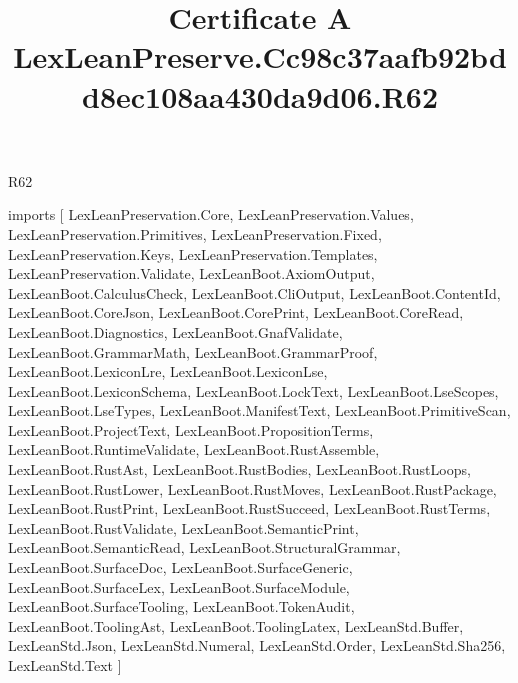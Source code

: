 \begin{lexlean}{R62}
\title{Certificate A LexLeanPreserve.Cc98c37aafb92bdd8ec108aa430da9d06.R62}
\begin{coremodule}
imports [
  LexLeanPreservation.Core,
  LexLeanPreservation.Values,
  LexLeanPreservation.Primitives,
  LexLeanPreservation.Fixed,
  LexLeanPreservation.Keys,
  LexLeanPreservation.Templates,
  LexLeanPreservation.Validate,
  LexLeanBoot.AxiomOutput,
  LexLeanBoot.CalculusCheck,
  LexLeanBoot.CliOutput,
  LexLeanBoot.ContentId,
  LexLeanBoot.CoreJson,
  LexLeanBoot.CorePrint,
  LexLeanBoot.CoreRead,
  LexLeanBoot.Diagnostics,
  LexLeanBoot.GnafValidate,
  LexLeanBoot.GrammarMath,
  LexLeanBoot.GrammarProof,
  LexLeanBoot.LexiconLre,
  LexLeanBoot.LexiconLse,
  LexLeanBoot.LexiconSchema,
  LexLeanBoot.LockText,
  LexLeanBoot.LseScopes,
  LexLeanBoot.LseTypes,
  LexLeanBoot.ManifestText,
  LexLeanBoot.PrimitiveScan,
  LexLeanBoot.ProjectText,
  LexLeanBoot.PropositionTerms,
  LexLeanBoot.RuntimeValidate,
  LexLeanBoot.RustAssemble,
  LexLeanBoot.RustAst,
  LexLeanBoot.RustBodies,
  LexLeanBoot.RustLoops,
  LexLeanBoot.RustLower,
  LexLeanBoot.RustMoves,
  LexLeanBoot.RustPackage,
  LexLeanBoot.RustPrint,
  LexLeanBoot.RustSucceed,
  LexLeanBoot.RustTerms,
  LexLeanBoot.RustValidate,
  LexLeanBoot.SemanticPrint,
  LexLeanBoot.SemanticRead,
  LexLeanBoot.StructuralGrammar,
  LexLeanBoot.SurfaceDoc,
  LexLeanBoot.SurfaceGeneric,
  LexLeanBoot.SurfaceLex,
  LexLeanBoot.SurfaceModule,
  LexLeanBoot.SurfaceTooling,
  LexLeanBoot.TokenAudit,
  LexLeanBoot.ToolingAst,
  LexLeanBoot.ToolingLatex,
  LexLeanStd.Buffer,
  LexLeanStd.Json,
  LexLeanStd.Numeral,
  LexLeanStd.Order,
  LexLeanStd.Sha256,
  LexLeanStd.Text
]


\end{coremodule}
\end{lexlean}
